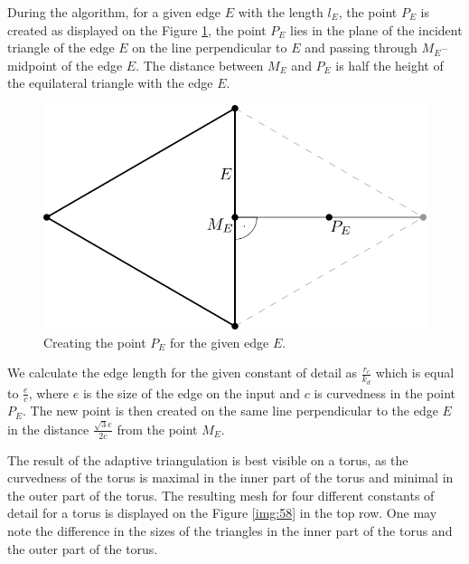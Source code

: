 During the algorithm, for a given edge $E$ with the length $l_E$, the point
$P_E$ is created as displayed on the Figure \ref{img:57}, the point $P_E$ lies
in the plane of the incident triangle of the edge $E$ on the line perpendicular
to $E$ and passing through $M_E$--midpoint of the edge $E$. The distance between
$M_E$ and $P_E$ is half the height of the equilateral triangle with the edge $E$.

\begin{figure}
    \centerline{\includegraphics[scale=0.5]{images/img57}}
    \caption[Creating the point $P_E$]
    {Creating the point $P_E$ for the given edge $E$.}
    \label{img:57}
\end{figure}

We calculate the edge length for the given constant of detail as $\frac{r_c}{k_d}$
which is equal to $\frac{e}{c}$, where $e$ is the size of the edge on the input 
and $c$ is curvedness in the point $P_E$. The new point is then created on the same
line perpendicular to the edge $E$ in the distance $\frac{\sqrt{3}e}{2c}$ from the point
$M_E$.

The result of the adaptive triangulation is best visible on a torus, as the curvedness
of the torus is maximal in the inner part of the torus and minimal in the outer part of the torus.
The resulting mesh for four different constants of detail for a torus is displayed on the
Figure \ref{img:58} in the top row. One may note the difference in the sizes of the 
triangles in the inner
part of the torus and the outer part of the torus.

